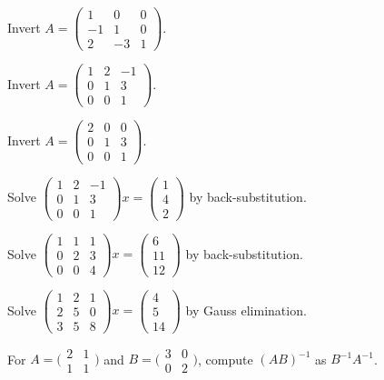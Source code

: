 \begin{problems}
    \item Invert $A = \begin{pmatrix} 1 & 0 & 0 \\ -1 & 1 & 0 \\ 2 & -3 & 1 \end{pmatrix}$.
    \item Invert $A = \begin{pmatrix} 1 & 2 & -1 \\ 0 & 1 & 3 \\ 0 & 0 & 1 \end{pmatrix}$.
    \item Invert $A = \begin{pmatrix} 2 & 0 & 0 \\ 0 & 1 & 3 \\ 0 & 0 & 1 \end{pmatrix}$.
    \item Solve $\begin{pmatrix} 1 & 2 & -1 \\ 0 & 1 & 3 \\ 0 & 0 & 1 \end{pmatrix} x = \begin{pmatrix} 1 \\ 4 \\ 2 \end{pmatrix}$ by back-substitution.
    \item Solve $\begin{pmatrix} 1 & 1 & 1 \\ 0 & 2 & 3 \\ 0 & 0 & 4 \end{pmatrix} x = \begin{pmatrix} 6 \\ 11 \\ 12 \end{pmatrix}$ by back-substitution.
    \item Solve $\begin{pmatrix} 1 & 2 & 1 \\ 2 & 5 & 0 \\ 3 & 5 & 8 \end{pmatrix} x = \begin{pmatrix} 4 \\ 5 \\ 14 \end{pmatrix}$ by Gauss elimination.
    \item For $A = \bigl(\begin{smallmatrix} 2 & 1 \\ 1 & 1 \end{smallmatrix}\bigr)$ and $B = \bigl(\begin{smallmatrix} 3 & 0 \\ 0 & 2 \end{smallmatrix}\bigr)$, compute $(A B)^{-1}$ as $B^{-1} A^{-1}$.

\end{problems}
